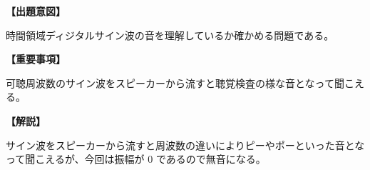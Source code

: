 \noindent \textbf{【出題意図】}

\noindent 時間領域ディジタルサイン波の音を理解しているか確かめる問題である。

\vspace{1em}
\noindent \textbf{【重要事項】}

\bigskip
\noindent\quad 可聴周波数のサイン波をスピーカーから流すと聴覚検査の様な音となって聞こえる。


\vspace{1em}
\noindent \textbf{【解説】}

\noindent サイン波をスピーカーから流すと周波数の違いによりピーやポーといった音となって聞こえるが、今回は振幅が 0 であるので無音になる。
